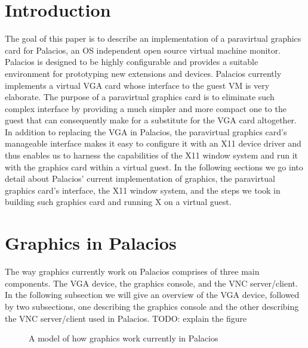 \documentclass{acm_proc_article-sp}
\begin{document}
\section{Introduction}
The goal of this paper is to describe an implementation of a paravirtual
graphics card for Palacios, an OS independent open source virtual machine
monitor. \cite{Lange: Technical} Palacios is designed to be 
highly configurable and provides a suitable environment
for prototyping new extensions and devices. Palacios currently implements
  a virtual VGA card whose interface to the guest VM is very elaborate. The
  purpose of a paravirtual graphics card is to eliminate such complex interface
  by providing a much simpler and more compact one to the guest that can
  consequently make for a substitute for the VGA card altogether. In addition to
  replacing the VGA in Palacios, the paravirtual graphics card's manageable
  interface makes it easy to configure it with an X11 device driver and thus
  enables us to harness the capabilities of the X11 window system and run it with the
  graphics card within a virtual guest. In the following sections we go into
  detail about Palacios' current implementation of graphics, the paravirtual
  graphics card's interface, the X11 window system, and the steps we took in
  building such graphics card and running X on a virtual guest.

\section{Graphics in Palacios}
The way graphics currently work on Palacios comprises of three main components.
The VGA device, the graphics console, and the VNC server/client. In the
following subsection we will give an overview of the VGA device, followed by two
subsections, one describing the graphics console and the other describing the
VNC server/client used in Palacios.
 TODO: explain the figure
\begin{figure}[h]                                              
\centering                                                 
{}                                      
\caption{A model of how graphics work currently in Palacios}   
\end{figure}                                               
\end{document}
